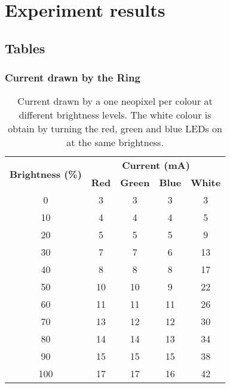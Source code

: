 \chapter{Experiment results}

\section{Tables}

\subsection{Current drawn by the Ring}
\begin{table}[h!]
	\centering
	\caption{Current drawn by a one neopixel per colour at different brightness levels. The white colour is obtain by turning the red, green and blue LEDs on at the same brightness.}
	\label{table:current_one_pixel}
	\begin{tabular}{ccccc}
		\hline
		\hline
		\toprule
		\multirow{2}{*}{\textbf{Brightness (\%)}} & \multicolumn{4}{c}{\textbf{Current (mA)}}\\
		& \textbf{Red} & \textbf{Green} & \textbf{Blue} & \textbf{White} \\
		\hline
		\toprule
		\toprule
		0    &    3    &    3    &    3    &    3    \\
		10    &    4    &    4    &    4    &    5    \\
		20    &    5    &    5    &    5    &    9    \\
		30    &    7    &    7    &    6    &    13    \\
		40    &    8    &    8    &    8    &    17    \\
		50    &    10    &    10    &    9    &    22    \\
		60    &    11    &    11    &    11    &    26    \\
		70    &    13    &    12    &    12    &    30    \\
		80    &    14    &    14    &    13    &    34    \\
		90    &    15    &    15    &    15    &    38    \\
		100    &    17    &    17    &    16    &    42    \\
		\bottomrule
		\hline
		\hline
	\end{tabular}
\end{table}
